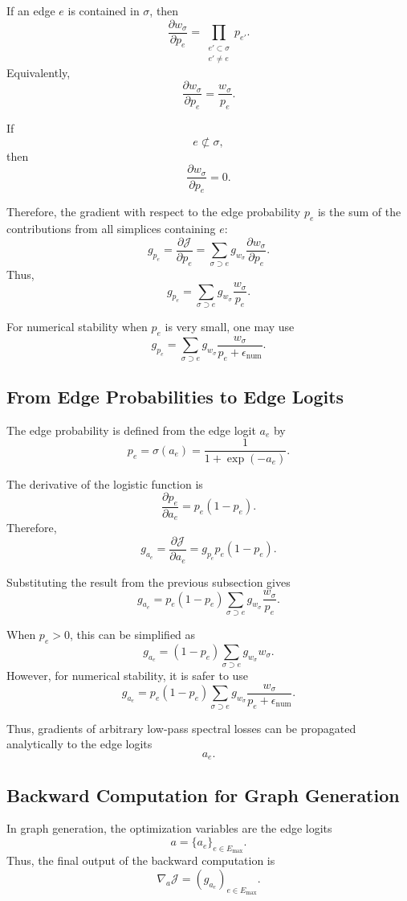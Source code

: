 \documentclass[pdflatex,sn-mathphys-ay]{sn-jnl}%
\theoremstyle{thmstyleone}%
\theoremstyle{thmstyletwo}%
\theoremstyle{thmstylethree}%
\begin{document}
\begin{appendices}
If an edge \(e\) is contained in \(\sigma\), then
\[
\frac{\partial w_\sigma}{\partial p_e}
=
\prod_{\substack{e'\subset\sigma\\e'\ne e}}
p_{e'}.
\]
Equivalently,
\[
\frac{\partial w_\sigma}{\partial p_e}
=
\frac{w_\sigma}{p_e}.
\]

If
\[
e\not\subset\sigma,
\]
then
\[
\frac{\partial w_\sigma}{\partial p_e}
=
0.
\]

Therefore, the gradient with respect to the edge probability \(p_e\) is the sum of the contributions from all simplices containing \(e\):
\[
g_{p_e}
=
\frac{\partial\mathcal{J}}{\partial p_e}
=
\sum_{\sigma\supset e}
g_{w_\sigma}
\frac{\partial w_\sigma}{\partial p_e}.
\]
Thus,
\[
g_{p_e}
=
\sum_{\sigma\supset e}
g_{w_\sigma}
\frac{w_\sigma}{p_e}.
\]

For numerical stability when \(p_e\) is very small, one may use
\[
g_{p_e}
=
\sum_{\sigma\supset e}
g_{w_\sigma}
\frac{w_\sigma}{p_e+\epsilon_{\mathrm{num}}}.
\]

\subsection{From Edge Probabilities to Edge Logits}

The edge probability is defined from the edge logit \(a_e\) by
\[
p_e
=
\sigma(a_e)
=
\frac{1}{1+\exp(-a_e)}.
\]

The derivative of the logistic function is
\[
\frac{\partial p_e}{\partial a_e}
=
p_e(1-p_e).
\]
Therefore,
\[
g_{a_e}
=
\frac{\partial\mathcal{J}}{\partial a_e}
=
g_{p_e}
p_e(1-p_e).
\]

Substituting the result from the previous subsection gives
\[
g_{a_e}
=
p_e(1-p_e)
\sum_{\sigma\supset e}
g_{w_\sigma}
\frac{w_\sigma}{p_e}.
\]

When \(p_e>0\), this can be simplified as
\[
g_{a_e}
=
(1-p_e)
\sum_{\sigma\supset e}
g_{w_\sigma}
w_\sigma.
\]
However, for numerical stability, it is safer to use
\[
g_{a_e}
=
p_e(1-p_e)
\sum_{\sigma\supset e}
g_{w_\sigma}
\frac{w_\sigma}{p_e+\epsilon_{\mathrm{num}}}.
\]

Thus, gradients of arbitrary low-pass spectral losses can be propagated analytically to the edge logits
\[
a_e.
\]

\subsection{Backward Computation for Graph Generation}

In graph generation, the optimization variables are the edge logits
\[
a=\{a_e\}_{e\in E_{\max}}.
\]
Thus, the final output of the backward computation is
\[
\nabla_a\mathcal{J}
=
\left(
g_{a_e}
\right)_{e\in E_{\max}}.
\]


\end{appendices}
\end{document}
